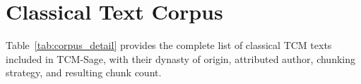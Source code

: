 \documentclass[11pt,a4paper]{report}
\begin{document}















\appendix
\chapter{Classical Text Corpus}

Table~\ref{tab:corpus_detail} provides the complete list of classical TCM texts included in TCM-Sage, with their dynasty of origin, attributed author, chunking strategy, and resulting chunk count.
\end{document}
